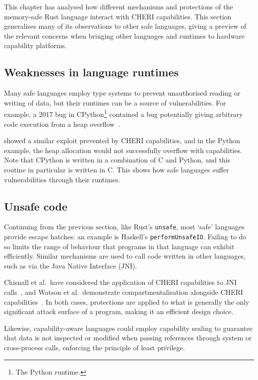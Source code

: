 \documentclass[dissertation.tex]{subfiles}
\begin{document}
This chapter has analysed how different mechanisms and protections of
the memory-safe Rust language interact with CHERI capabilities.
This section generalises many of its observations to other safe
languages, giving a preview of the relevant concerns when bringing other
languages and runtimes to hardware capability platforms.


\subsection{Weaknesses in language runtimes}
Many safe languages employ type systems to prevent unauthorised reading
or writing of data, but their runtimes can be a source of
vulnerabilities.
For example, a 2017 bug in CPython\footnote{The Python runtime.}
contained a bug potentially giving arbitrary code execution from a heap
overflow~\cite{cpython-overflow}.

 showed a similar exploit prevented by CHERI
capabilities, and in the Python example, the heap allocation would not
successfully overflow with capabilities.
Note that CPython is written in a combination of C and Python, and this
routine in particular is written in C.
This shows how safe languages suffer vulnerabilities through their
runtimes.


\subsection{Unsafe code}
Continuing from the previous section, like Rust's \texttt{unsafe}, most
`safe' languages provide escape hatches: an example is Haskell's
\texttt{performUnsafeIO}.
Failing to do so limits the range of behaviour that programs in that
language can exhibit efficiently.
Similar mechanisms are used to call code written in other languages,
such as via the Java Native Interface (JNI).

Chisnall et al.\ have considered the application of CHERI capabilities
to JNI calls~\cite{cheri-jni}, and Watson et al.\ demonstrate
compartmentalisation alongside CHERI capabilities~\cite{cheri2015}.
In both cases, protections are applied to what is generally the only
significant attack surface of a program, making it an efficient design
choice.

Likewise, capability-aware languages could employ capability sealing to
guarantee that data is not inspected or modified when passing references
through system or cross-process calls, enforcing the principle of least
privilege.
\end{document}

